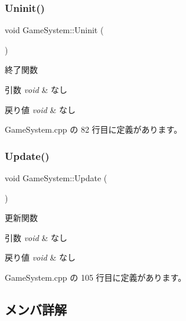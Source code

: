 \subsubsection{\texorpdfstring{Uninit()}{Uninit()}}
{\footnotesize\ttfamily void Game\+System\+::\+Uninit (\begin{DoxyParamCaption}{ }\end{DoxyParamCaption})}



終了関数 


\begin{DoxyParams}{引数}
{\em void} & なし \\
\hline
\end{DoxyParams}

\begin{DoxyRetVals}{戻り値}
{\em void} & なし \\
\hline
\end{DoxyRetVals}


 Game\+System.\+cpp の 82 行目に定義があります。

\mbox{\label{class_game_system_ab0add1f2bd97d3b125a5682f571053a3}} 
\subsubsection{\texorpdfstring{Update()}{Update()}}
{\footnotesize\ttfamily void Game\+System\+::\+Update (\begin{DoxyParamCaption}{ }\end{DoxyParamCaption})}



更新関数 


\begin{DoxyParams}{引数}
{\em void} & なし \\
\hline
\end{DoxyParams}

\begin{DoxyRetVals}{戻り値}
{\em void} & なし \\
\hline
\end{DoxyRetVals}


 Game\+System.\+cpp の 105 行目に定義があります。



\subsection{メンバ詳解}
\mbox{\label{class_game_system_ac398ab7a013177879fd3dd9a9f8d7e48}} 
